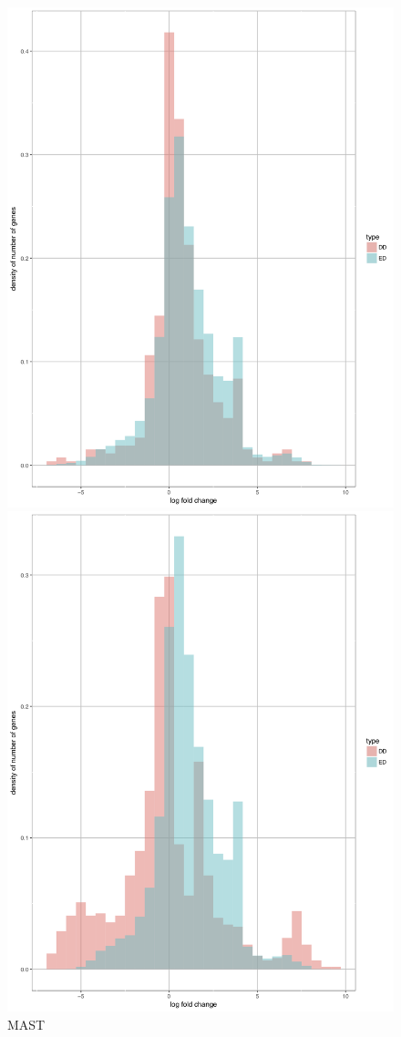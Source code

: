 \documentclass[11pt]{amsart}
\begin{document}
\begin{figure}[H]
  \includegraphics[width=\linewidth]{G74596_mast.png}
  \caption{MAST}
\endminipage\hfill
{}
  \includegraphics[width=\linewidth]{G74596_scdd.png}

\end{figure}
\end{document}
